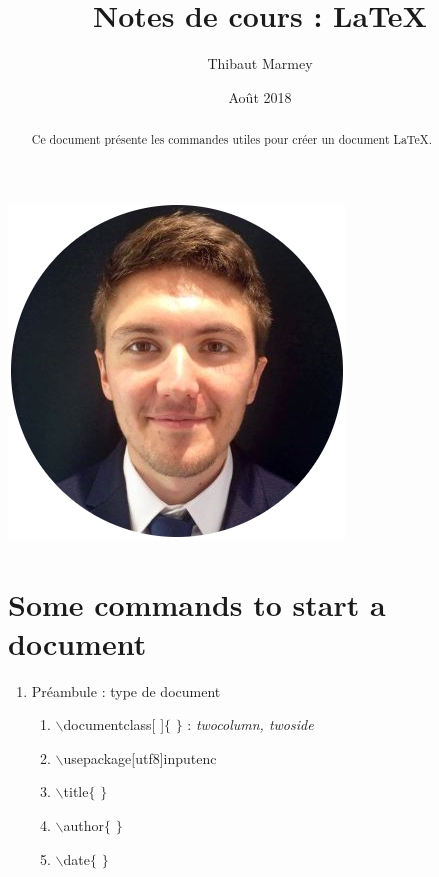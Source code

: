 \documentclass[12pt, letterpaper]{article}
\title{Notes de cours : \LaTeX}
\author{Thibaut Marmey}
\date{Août 2018}
\begin{document}
\maketitle
\begin{center}
\includegraphics[scale=0.3]{CV_photo_Thibaut_Marmey}
\end{center}
\vspace{0.25cm}
\renewcommand{\abstractname}{Résumé}
\begin{abstract}
Ce document présente les commandes utiles pour créer un document \LaTeX.
\end{abstract}

\tableofcontents

\newpage
\section{Some commands to start a document}
\begin{enumerate}
\item Préambule : type de document
\begin{enumerate}
\item $\backslash$documentclass[ ]$\lbrace$ $\rbrace$ : \textit{twocolumn, twoside}
\item $\backslash$usepackage[utf8]{inputenc}
\item $\backslash$title$\lbrace$ $\rbrace$
\item $\backslash$author$\lbrace$ $\rbrace$
\item $\backslash$date$\lbrace$ $\rbrace$
\end{enumerate}
\end{enumerate}
\end{document}
